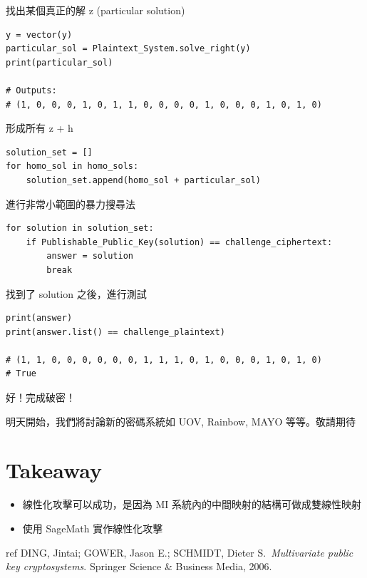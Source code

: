 \documentclass[
]{article}
\providecommand{\tightlist}{%
  \setlength{\itemsep}{0pt}\setlength{\parskip}{0pt}}
\begin{document}
找出某個真正的解 z (particular solution)

\begin{verbatim}
y = vector(y)
particular_sol = Plaintext_System.solve_right(y)
print(particular_sol)

# Outputs:
# (1, 0, 0, 0, 1, 0, 1, 1, 0, 0, 0, 0, 1, 0, 0, 0, 1, 0, 1, 0)
\end{verbatim}

形成所有 z + h

\begin{verbatim}
solution_set = []
for homo_sol in homo_sols:
    solution_set.append(homo_sol + particular_sol)
\end{verbatim}

進行非常小範圍的暴力搜尋法

\begin{verbatim}
for solution in solution_set:
    if Publishable_Public_Key(solution) == challenge_ciphertext:
        answer = solution
        break
\end{verbatim}

找到了 solution 之後，進行測試

\begin{verbatim}
print(answer)
print(answer.list() == challenge_plaintext)

# (1, 1, 0, 0, 0, 0, 0, 0, 1, 1, 1, 0, 1, 0, 0, 0, 1, 0, 1, 0)
# True
\end{verbatim}

好！完成破密！

明天開始，我們將討論新的密碼系統如 UOV, Rainbow, MAYO 等等。敬請期待

\hypertarget{takeaway}{%
\section{Takeaway}\label{takeaway}}

\begin{itemize}
\tightlist
\item
  線性化攻擊可以成功，是因為 MI 系統內的中間映射的結構可做成雙線性映射
\item
  使用 SageMath 實作線性化攻擊
\end{itemize}

ref DING, Jintai; GOWER, Jason E.; SCHMIDT, Dieter S.~\emph{Multivariate
public key cryptosystems}. Springer Science \& Business Media, 2006.
\end{document}
